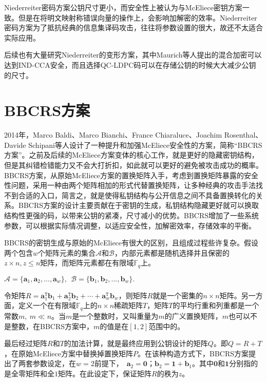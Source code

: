 Niederreiter密码方案公钥尺寸更小，而安全性上被认为与McEliece密钥方案一致。但是在将明文映射称错误向量的操作上，会影响加解密的效率。Niederreiter密码方案为了抵抗经典的信息集译码攻击，往往将参数设置的很大，故还不太适合实际应用。

后续也有大量研究Niederreiter的变形方案，其中Maurich等人提出的混合加密\cite{Von2016IND}可以达到IND-CCA安全，而且选择QC-LDPC码可以在存储公钥的时候大大减少公钥的尺寸。
\section{BBCRS方案}
2014年，Marco Baldi、Marco Bianchi、France Chiaraluce、Joachim Rosenthal、Davide Schipani等人设计了一种提升和加强McEliece安全性的方案，简称“BBCRS方案”。之前及后续的McEliece方案变体的核心工作，就是更好的隐藏密钥结构，但是其纠错检错能力又不会大打折扣，如此就可以更好的避免被攻击成功的概率。BBCRS方案，从原始McEliece方案的置换矩阵入手，考虑到置换矩阵暴露的安全性问题，采用一种由两个矩阵相加的形式代替置换矩阵，让多种经典的攻击手法找不到合适的入口，简言之，就是使得私钥结构与公开信息之间不具备置换转化的关系。BBCRS方案的设计主要贡献在于密钥的生成，私钥结构隐藏更好就可以换取结构性更强的码，以带来公钥的紧凑，尺寸减小的优势。BBCRS增加了一些系统参数，可以根据实际情况调整，以适应安全性，加解密效率，存储效率的平衡。

BBCRS的密钥生成与原始的McEliece有很大的区别，且组成过程些许复杂。假设两个包含$w$个矩阵元素的集合$\mathcal{A}$和$\mathcal{B}$，内部元素都是随机选择并且保密的$z \times n, z \leq n$矩阵，而矩阵元素都在有限域$\mathbb{F}_q$上。
\begin{center}
	$\mathcal{A} = \{\mathbf{a}_1,\mathbf{a}_2,...,\mathbf{a}_w\},~$$~\mathcal{B} = \{\mathbf{b}_1,\mathbf{b}_2,...,\mathbf{b}_w\}.$
\end{center}
\begin{flushleft}
	令矩阵$R = \mathbf{a}_1^\mathtt{T}\mathbf{b}_1 + \mathbf{a}_2^\mathtt{T}\mathbf{b}_2 + \cdots + \mathbf{a}_w^\mathtt{T}\mathbf{b}_w$，则矩阵$R$就是一个密集的$n \times n$矩阵。另一方面，定义一个在有限域$\mathbb{F}_q$上的$n \times n$稀疏矩阵$T$，矩阵$T$的平均行重和列重都是一个常数$m,~ m \ll n$。当$m$是一个整数时，又叫重量为$m$的广义置换矩阵，$m$也可以不是整数，在BBCRS方案中，$m$的值是在$[1,2]$范围中的。
\end{flushleft}

最后经过矩阵$R$和$T$的加法计算，就是最终应用到公钥设计的矩阵$Q$。即$Q=R+T$，在原始McEliece方案中替换掉置换矩阵$P$。在该种构造方式下，BBCRS方案提出了两套参数设定，在$w = 2$前提下，~$\mathbf{a}_2 = \mathbf{0}$；$\mathbf{b}_2=\mathbf{1} + \mathbf{b}_1$。其中$\mathbf{0}$和$\mathbf{1}$分别指的是全零矩阵和全$1$矩阵。在此设定下，保证矩阵$R$的秩为$z$。

